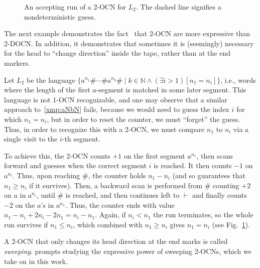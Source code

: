 \documentclass[USenglish]{lipics-v2021}
\newcommand{\lmark}{\vdash}
\newcommand{\bbN}{\mathbb{N}}
\begin{document}
\begin{example}
\begin{figure}[ht]
\begin{minipage}{.24\textwidth}
				\caption{An accepting run of a 2-OCN for $L_2$. The dashed line signifies a nondeterministic guess. }
				\label{fig:example_2_2}
			\end{minipage}
		\end{figure}
	\end{example}
	The next example demonstrates the fact~\cite{chan1987two} that 2-OCN are more expressive than 2-DOCN. In addition, it demonstrates that sometimes it is (seemingly) necessary for the head to ``change direction'' inside the tape, rather than at the end markers. 
	\begin{example}
		\label{xmp:nondet_aNbN} Let \(L_2\) be the language
		$\{a^{n_1}\#\cdots \#a^{n_k}\#\mid k\in \bbN\wedge (\exists i > 1)[n_1=n_i]\}$, i.e., words where the length of the first $a$-segment is matched in some later segment. This language
		is not 1-OCN recognizable, and one may observe that a similar approach
		to~\cref{xmp:aNbN} fails, because we would need to guess the index $i$ for
		which $n_1=n_i$, but in order to reset the counter, we must ``forget'' the
		guess. Thus, in order to recognize this with a 2-OCN, we must compare $n_1$
		to $n_i$ via a single visit to the $i$-th segment.
		
		To achieve this, the 2-OCN counts $+1$ on
		the first segment $a^{n_1}$, then scans forward and guesses when the
		correct segment $i$ is reached. It then counts $-1$ on $a^{n_i}$. Thus,
		upon reaching $\#$, the counter holds $n_1-n_i$ (and so guarantees that
		$n_1\ge n_i$ if it survives).  Then, a backward scan is performed from $\#$
		counting $+2$ on $a$ in $a^{n_i}$, until $\#$ is reached, and then
		continues left to $\lmark$ and finally counts $-2$ on the $a$'s in
		$a^{n_1}$.  Thus, the counter ends with value
		$n_1-n_i+2n_i-2n_1=n_i-n_1$. Again, if $n_i<n_1$ the run terminates, so the
		whole run survives if $n_1\le n_i$, which combined with $n_1\ge n_i$ gives $n_1=n_i$ (see Fig.~\ref{fig:example_2_2}).
	\end{example}
	A 2-OCN that only changes its head direction at the end marks is called
	\emph{sweeping}.  prompts studying the expressive power of
	sweeping 2-OCNs, which we take on in this work.
	
\end{document}
